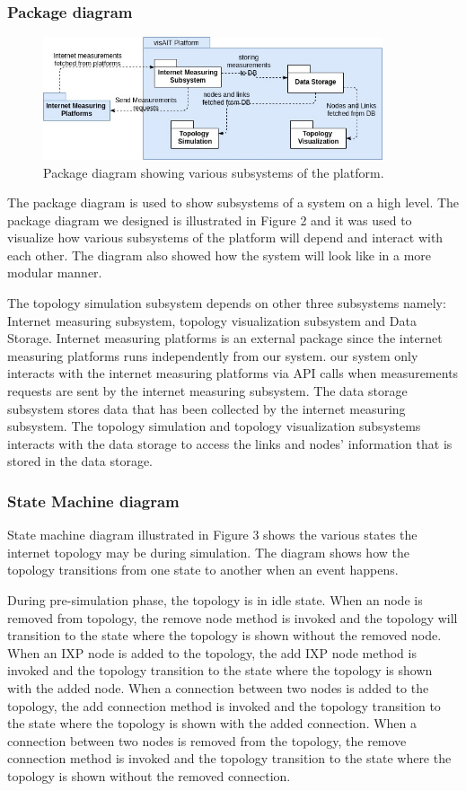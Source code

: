 \subsubsection{Package diagram}
\begin{figure}[htp]
   \centering
     \includegraphics[width=10cm]{sections/pictures-diagrams/Package-Diagrma-v2.jpg}
   \caption{Package diagram showing various subsystems of the platform.}
    \label{figure:galaxy}
\end{figure}
The package diagram is used to show subsystems of a system on a high level. The package diagram we designed is illustrated in Figure 2 and it was used to visualize how various subsystems of the platform will depend and interact with each other. The diagram also showed how the system will look like in a more modular manner. 

The topology simulation subsystem depends on other three subsystems namely: Internet measuring subsystem,  topology visualization subsystem and Data Storage. Internet measuring platforms is an external package since the internet measuring platforms runs independently from our system. our system only interacts with the internet measuring platforms via API calls when measurements requests are sent by the internet measuring subsystem. The data storage subsystem stores data that has been collected by the internet measuring subsystem. The topology simulation and topology visualization subsystems interacts with the data storage to access the links and nodes' information that is stored in the data storage. 

\subsubsection {State Machine diagram}
State machine diagram illustrated in Figure 3 shows the various states the internet topology may be during simulation. The diagram shows how the topology transitions from one state to another when an event happens.

During pre-simulation phase, the topology is in idle state. When an node is removed from topology, the remove node method is invoked and the topology will transition to the state where the topology is shown without the removed node. When an IXP node is added to the topology, the add IXP node method is invoked and the topology transition to the state where the topology is shown with the added node. When a connection between two nodes is added to the topology, the add connection method is invoked and the topology transition to the state where the topology is shown with the added connection. When a connection between two nodes is removed from the topology, the remove connection method is invoked and the topology transition to the state where the topology is shown without the removed connection.

